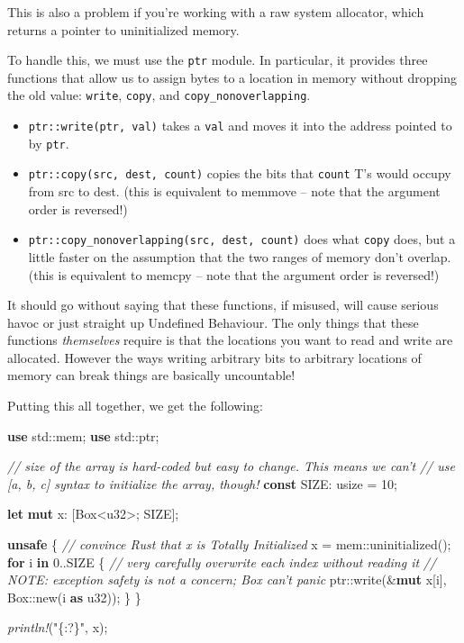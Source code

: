 \documentclass[a4paper,]{book}
\newenvironment{Shaded}{\begin{snugshade}}{\end{snugshade}}
\newcommand{\KeywordTok}[1]{\textcolor[rgb]{0.13,0.29,0.53}{\textbf{{#1}}}}
\newcommand{\DataTypeTok}[1]{\textcolor[rgb]{0.13,0.29,0.53}{{#1}}}
\newcommand{\DecValTok}[1]{\textcolor[rgb]{0.00,0.00,0.81}{{#1}}}
\newcommand{\StringTok}[1]{\textcolor[rgb]{0.31,0.60,0.02}{{#1}}}
\newcommand{\CommentTok}[1]{\textcolor[rgb]{0.56,0.35,0.01}{\textit{{#1}}}}
\newcommand{\PreprocessorTok}[1]{\textcolor[rgb]{0.56,0.35,0.01}{\textit{{#1}}}}
\newcommand{\NormalTok}[1]{{#1}}
\providecommand{\tightlist}{%
  \setlength{\itemsep}{0pt}\setlength{\parskip}{0pt}}
\begin{document}
This is also a problem if you're working with a raw system allocator,
which returns a pointer to uninitialized memory.

To handle this, we must use the \texttt{ptr} module. In particular, it
provides three functions that allow us to assign bytes to a location in
memory without dropping the old value: \texttt{write}, \texttt{copy},
and \texttt{copy\_nonoverlapping}.

\begin{itemize}
\tightlist
\item
  \texttt{ptr::write(ptr,\ val)} takes a \texttt{val} and moves it into
  the address pointed to by \texttt{ptr}.
\item
  \texttt{ptr::copy(src,\ dest,\ count)} copies the bits that
  \texttt{count} T's would occupy from src to dest. (this is equivalent
  to memmove -- note that the argument order is reversed!)
\item
  \texttt{ptr::copy\_nonoverlapping(src,\ dest,\ count)} does what
  \texttt{copy} does, but a little faster on the assumption that the two
  ranges of memory don't overlap. (this is equivalent to memcpy -- note
  that the argument order is reversed!)
\end{itemize}

It should go without saying that these functions, if misused, will cause
serious havoc or just straight up Undefined Behaviour. The only things
that these functions \emph{themselves} require is that the locations you
want to read and write are allocated. However the ways writing arbitrary
bits to arbitrary locations of memory can break things are basically
uncountable!

Putting this all together, we get the following:

\begin{Shaded}
\begin{Highlighting}[]
\KeywordTok{use} \NormalTok{std::mem;}
\KeywordTok{use} \NormalTok{std::ptr;}

\CommentTok{// size of the array is hard-coded but easy to change. This means we can't}
\CommentTok{// use [a, b, c] syntax to initialize the array, though!}
\KeywordTok{const} \NormalTok{SIZE: }\DataTypeTok{usize} \NormalTok{= }\DecValTok{10}\NormalTok{;}

\KeywordTok{let} \KeywordTok{mut} \NormalTok{x: [}\DataTypeTok{Box}\NormalTok{<}\DataTypeTok{u32}\NormalTok{>; SIZE];}

\KeywordTok{unsafe} \NormalTok{\{}
    \CommentTok{// convince Rust that x is Totally Initialized}
    \NormalTok{x = mem::uninitialized();}
    \KeywordTok{for} \NormalTok{i }\KeywordTok{in} \DecValTok{0.}\NormalTok{.SIZE \{}
        \CommentTok{// very carefully overwrite each index without reading it}
        \CommentTok{// NOTE: exception safety is not a concern; Box can't panic}
        \NormalTok{ptr::write(&}\KeywordTok{mut} \NormalTok{x[i], }\DataTypeTok{Box}\NormalTok{::new(i }\KeywordTok{as} \DataTypeTok{u32}\NormalTok{));}
    \NormalTok{\}}
\NormalTok{\}}

\PreprocessorTok{println!}\NormalTok{(}\StringTok{"\{:?\}"}\NormalTok{, x);}
\end{Highlighting}
\end{Shaded}
\end{document}
